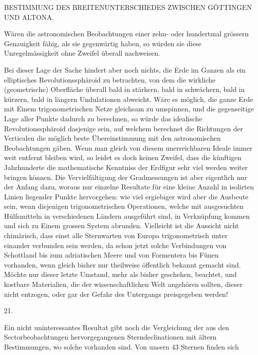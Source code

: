 \clearpage
\noindent{}\parbox[t]{\dimexpr\textwidth-10mm\relax}{\centering\scriptsize BESTIMMUNG DES BREITENUNTERSCHIEDES ZWISCHEN GÖTTINGEN UND ALTONA.}\par
\noindent Wären die astronomischen Beobachtungen einer zehn- oder hundertmal grössern Genauigkeit fähig, als sie gegenwärtig haben, so würden sie diese Unregelmässigkeit ohne Zweifel überall nachweisen.

Bei dieser Lage der Sache hindert aber noch nichts, die Erde im Ganzen als ein elliptisches Revolutionssphäroid zu betrachten, von dem die wirkliche (geometrische) Oberfläche überall bald in stärkern, bald in schwächern, bald in kürzern, bald in längern Undulationen abweicht. Wäre es möglich, die ganze Erde mit Einem trigonometrischen Netze gleichsam zu umspinnen, und die gegenseitige Lage aller Punkte dadurch zu berechnen, so würde das idealische Revolutionssphäroid dasjenige sein, auf welchem berechnet die Richtungen der Verticalen die möglich beste Übereinstimmung mit den astronomischen Beobachtungen gäben. Wenn man gleich von diesem unerreichbaren Ideale immer weit entfernt bleiben wird, so leidet es doch keinen Zweifel, dass die künftigen Jahrhunderte die mathematische Kenntniss der Erdfigur sehr viel werden weiter bringen können. Die Vervielfältigung der Gradmessungen ist aber eigentlich nur der Anfang dazu, woraus nur einzelne Resultate für eine kleine Anzahl in isolirten Linien liegender Punkte hervorgehen: wie viel ergiebiger wird aber die Ausbeute sein, wenn diejenigen trigonometrischen Operationen, welche mit ausgesuchten Hülfsmitteln in verschiedenen Ländern ausgeführt sind, in Verknüpfung kommen und sich zu Einem grossen System abrunden. Vielleicht ist die Aussicht nicht chimärisch, dass einst alle Sternwarten von Europa trigonometrisch unter einander verbunden sein werden, da schon jetzt solche Verbindungen von Schottland bis zum adriatischen Meere und von Formentera bis Fünen vorhanden, wenn gleich bisher nur theilweise öffentlich bekannt gemacht sind. Möchte nur dieser letzte Umstand, mehr als bisher geschehen, beachtet, und kostbare Materialien, die der wissenschaftlichen Welt angehören sollten, dieser nicht entzogen, oder gar der Gefahr des Untergangs preisgegeben werden!
\begin{center}21.\end{center}
Ein nicht uninteressantes Resultat gibt noch die Vergleichung der aus den Sectorbeobachtungen hervorgegangenen Sterndeclinationen mit ältern Bestimmungen, wo solche vorhanden sind. Von unsern 43 Sternen finden sich

